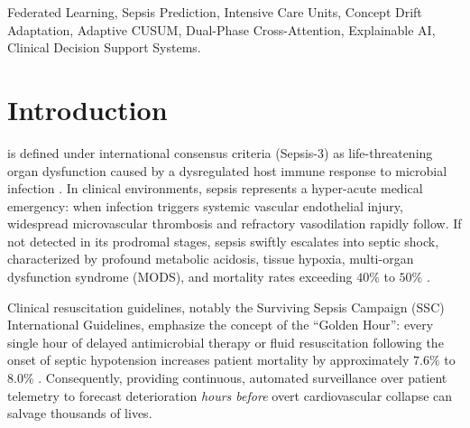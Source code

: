 \documentclass[journal,twocolumn,10pt]{IEEEtran}
\begin{document}
\begin{abstract}
Paired with an operational point-of-care Clinical Decision Support System (CDSS) providing temporal window attributions, physiological feature saliency, and counterfactual intervention simulation with a cohort mean early warning lead time of \textbf{4.98 hours} (up to 5.8 hours in exemplar cases), FPDAF provides an empirically grounded, privacy-preserving foundation for decentralized early sepsis surveillance.
\end{abstract}

\begin{IEEEkeywords}
Federated Learning, Sepsis Prediction, Intensive Care Units, Concept Drift Adaptation, Adaptive CUSUM, Dual-Phase Cross-Attention, Explainable AI, Clinical Decision Support Systems.
\end{IEEEkeywords}

\section{Introduction}
 is defined under international consensus criteria (Sepsis-3) as life-threatening organ dysfunction caused by a dysregulated host immune response to microbial infection \cite{singer2016sepsis3}. In clinical environments, sepsis represents a hyper-acute medical emergency: when infection triggers systemic vascular endothelial injury, widespread microvascular thrombosis and refractory vasodilation rapidly follow. If not detected in its prodromal stages, sepsis swiftly escalates into septic shock, characterized by profound metabolic acidosis, tissue hypoxia, multi-organ dysfunction syndrome (MODS), and mortality rates exceeding $40\%$ to $50\%$ \cite{evans2021surviving,dusing2025sepsis}. 

Clinical resuscitation guidelines, notably the Surviving Sepsis Campaign (SSC) International Guidelines, emphasize the concept of the ``Golden Hour'': every single hour of delayed antimicrobial therapy or fluid resuscitation following the onset of septic hypotension increases patient mortality by approximately $7.6\%$ to $8.0\%$ \cite{evans2021surviving}. Consequently, providing continuous, automated surveillance over patient telemetry to forecast deterioration \textit{hours before} overt cardiovascular collapse can salvage thousands of lives.
\end{document}

